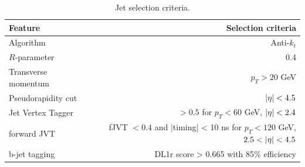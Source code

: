 \documentclass[12pt, a4paper]{book}
\begin{document}
\begin{table}[!h]
    \centering\caption[Jet selection criteria]{Jet selection criteria.}
    \begin{tabular}{l|r}\midrule\midrule
        Feature                                                                 & Selection criteria        \\\midrule
        Algorithm                                                               & Anti-$k_t$     \\
        $R$-parameter                                                           & 0.4     \\\midrule
        Transverse momentum                                                     & $p_T > 20$ GeV     \\
        Pseudorapidity cut                                                      & $\abs{\eta}<4.5$ \\
        Jet Vertex Tagger                                                       & $>0.5$ for $p_T<60$ GeV, $\abs{\eta}<2.4$ \\
        forward JVT                                                             & fJVT $<0.4$ and |timing| < 10 ns for $p_T<120$ GeV, $2.5<\abs{\eta}<4.5$ \\\midrule
        b-jet tagging                                                           & DL1r score > 0.665 with 85\% efficiency \\\midrule\midrule
    \end{tabular}
    \label{tab:jet_selec}
\end{table}
\end{document}
